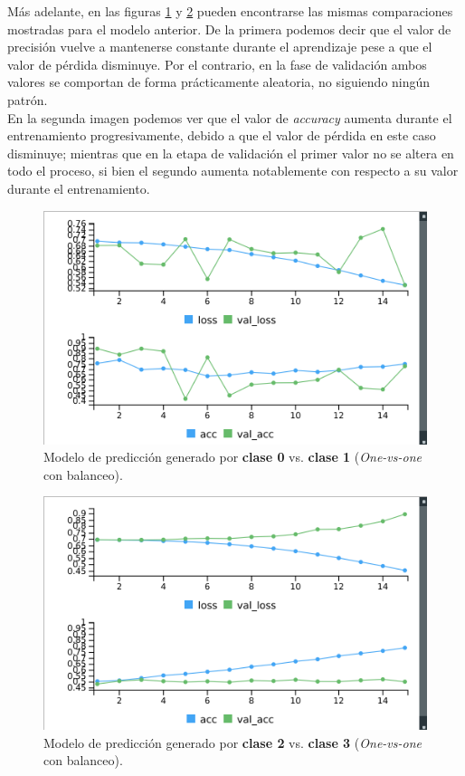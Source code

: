 \documentclass[]{article}
\begin{document}
		Más adelante, en las figuras \ref{ovo-bal-01} y \ref{ovo-bal-23} pueden encontrarse las mismas comparaciones mostradas para el modelo anterior. De la primera podemos decir que el valor de precisión vuelve a mantenerse constante durante el aprendizaje pese a que el valor de pérdida disminuye. Por el contrario, en la fase de validación ambos valores se comportan de forma prácticamente aleatoria, no siguiendo ningún patrón.\\
		
		En la segunda imagen podemos ver que el valor de \textit{accuracy} aumenta durante el entrenamiento progresivamente, debido a que el valor de pérdida en este caso disminuye; mientras que en la etapa de validación el primer valor no se altera en todo el proceso, si bien el segundo aumenta notablemente con respecto a su valor durante el entrenamiento.\\
	
		\begin{figure}[h]
			\centering
			\includegraphics[width=0.6\columnwidth]{./img/OVO_bal_01}
			\caption{Modelo de predicción generado por \textbf{clase 0} vs. \textbf{clase 1} (\textit{One-vs-one} con balanceo).}
			\label{ovo-bal-01}
		\end{figure}
		
		\begin{figure}[h]
			\centering
			\includegraphics[width=0.6\columnwidth]{./img/OVO_bal_23}
			\caption{Modelo de predicción generado por \textbf{clase 2} vs. \textbf{clase 3} (\textit{One-vs-one} con balanceo).}
			\label{ovo-bal-23}
		\end{figure}
		
\end{document}
